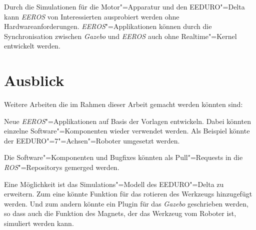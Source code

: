Durch die Simulationen für die Motor"=Apparatur und den EEDURO"=Delta kann \textit{EEROS} von Interessierten ausprobiert werden ohne Hardwareanforderungen.
\textit{EEROS}"=Applikationen können durch die Synchronisation zwischen \textit{Gazebo} und \textit{EEROS} auch ohne Realtime"=Kernel entwickelt werden.

 

\section{Ausblick}

Weitere Arbeiten die im Rahmen dieser Arbeit gemacht werden könnten sind:

Neue \textit{EEROS}"=Applikationen auf Basis der Vorlagen entwickeln.
Dabei könnten einzelne Software"=Komponenten wieder verwendet werden.
Als Beispiel könnte der EEDURO"=7"=Achsen"=Roboter umgesetzt werden.

Die Software"=Komponenten und Bugfixes könnten als Pull"=Requests in die \textit{ROS}"=Repositorys gemerged werden.

Eine Möglichkeit ist das Simulations"=Modell des EEDURO"=Delta zu erweitern.
Zum eine könnte Funktion für das rotieren des Werkzeugs hinzugefügt werden.
Und zum andern könnte ein Plugin für das \textit{Gazebo} geschrieben werden, so dass auch die Funktion des Magnets, der das Werkzeug vom Roboter ist, simuliert werden kann.


